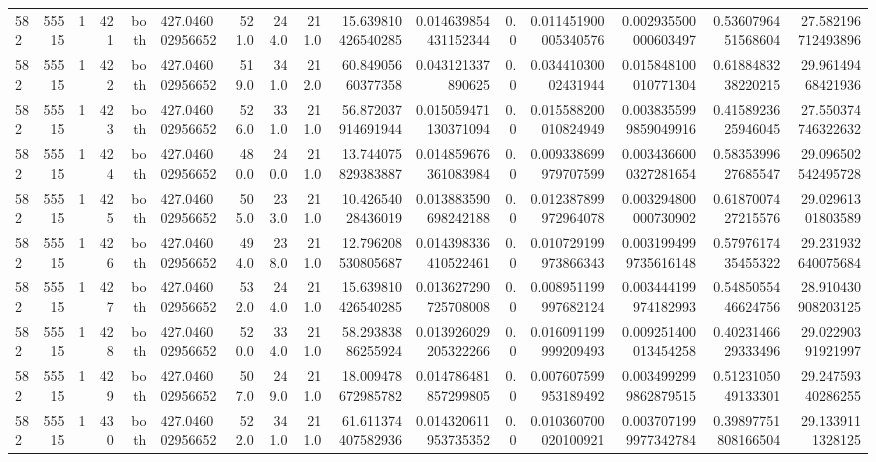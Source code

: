 \begin{tabular}{lrrrrlrrrrrrrrrr}
582 & 55515 & 1 & 421 & both & 427.046002956652 & 521.0 & 244.0 & 211.0 & 15.639810426540285 & 0.014639854431152344 & 0.0 & 0.011451900005340576 & 0.002935500000603497 & 0.5360796451568604 & 27.582196712493896 \\
582 & 55515 & 1 & 422 & both & 427.046002956652 & 519.0 & 341.0 & 212.0 & 60.84905660377358 & 0.043121337890625 & 0.0 & 0.03441030002431944 & 0.015848100010771304 & 0.6188483238220215 & 29.96149468421936 \\
582 & 55515 & 1 & 423 & both & 427.046002956652 & 526.0 & 331.0 & 211.0 & 56.872037914691944 & 0.015059471130371094 & 0.0 & 0.015588200010824949 & 0.0038355999859049916 & 0.4158923625946045 & 27.550374746322632 \\
582 & 55515 & 1 & 424 & both & 427.046002956652 & 480.0 & 240.0 & 211.0 & 13.744075829383887 & 0.014859676361083984 & 0.0 & 0.009338699979707599 & 0.0034366000327281654 & 0.5835399627685547 & 29.096502542495728 \\
582 & 55515 & 1 & 425 & both & 427.046002956652 & 505.0 & 233.0 & 211.0 & 10.42654028436019 & 0.013883590698242188 & 0.0 & 0.012387899972964078 & 0.003294800000730902 & 0.6187007427215576 & 29.02961301803589 \\
582 & 55515 & 1 & 426 & both & 427.046002956652 & 494.0 & 238.0 & 211.0 & 12.796208530805687 & 0.014398336410522461 & 0.0 & 0.010729199973866343 & 0.0031994999735616148 & 0.5797617435455322 & 29.231932640075684 \\
582 & 55515 & 1 & 427 & both & 427.046002956652 & 532.0 & 244.0 & 211.0 & 15.639810426540285 & 0.013627290725708008 & 0.0 & 0.008951199997682124 & 0.003444199974182993 & 0.5485055446624756 & 28.910430908203125 \\
582 & 55515 & 1 & 428 & both & 427.046002956652 & 520.0 & 334.0 & 211.0 & 58.29383886255924 & 0.013926029205322266 & 0.0 & 0.016091199999209493 & 0.009251400013454258 & 0.4023146629333496 & 29.02290391921997 \\
582 & 55515 & 1 & 429 & both & 427.046002956652 & 507.0 & 249.0 & 211.0 & 18.009478672985782 & 0.014786481857299805 & 0.0 & 0.007607599953189492 & 0.0034992999862879515 & 0.5123105049133301 & 29.24759340286255 \\
582 & 55515 & 1 & 430 & both & 427.046002956652 & 522.0 & 341.0 & 211.0 & 61.611374407582936 & 0.014320611953735352 & 0.0 & 0.010360700020100921 & 0.0037071999977342784 & 0.39897751808166504 & 29.1339111328125 \\
\hline
\end{tabular}
